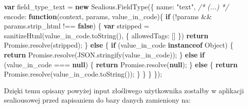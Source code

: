 \documentclass[12pt,polish,a4paper,]{report}
\newenvironment{Shaded}{}{}
\newcommand{\KeywordTok}[1]{\textcolor[rgb]{0.00,0.44,0.13}{\textbf{{#1}}}}
\newcommand{\DataTypeTok}[1]{\textcolor[rgb]{0.56,0.13,0.00}{{#1}}}
\newcommand{\StringTok}[1]{\textcolor[rgb]{0.25,0.44,0.63}{{#1}}}
\newcommand{\CommentTok}[1]{\textcolor[rgb]{0.38,0.63,0.69}{\textit{{#1}}}}
\newcommand{\VariableTok}[1]{\textcolor[rgb]{0.10,0.09,0.49}{{#1}}}
\newcommand{\ControlFlowTok}[1]{\textcolor[rgb]{0.00,0.44,0.13}{\textbf{{#1}}}}
\newcommand{\OperatorTok}[1]{\textcolor[rgb]{0.40,0.40,0.40}{{#1}}}
\newcommand{\AttributeTok}[1]{\textcolor[rgb]{0.49,0.56,0.16}{{#1}}}
\newcommand{\NormalTok}[1]{{#1}}
\begin{document}
\begin{Shaded}
\begin{Highlighting}[]
\KeywordTok{var} \NormalTok{field_type_text }\OperatorTok{=} \KeywordTok{new} \VariableTok{Sealious}\NormalTok{.}\AttributeTok{FieldType}\NormalTok{(}\OperatorTok{\{}
    \DataTypeTok{name}\OperatorTok{:} \StringTok{"text"}\OperatorTok{,}
    \CommentTok{/*}
\CommentTok{    (...)}
\CommentTok{    */}
    \DataTypeTok{encode}\OperatorTok{:} \KeywordTok{function}\NormalTok{(context}\OperatorTok{,} \NormalTok{params}\OperatorTok{,} \NormalTok{value_in_code)}\OperatorTok{\{}
        \ControlFlowTok{if} \NormalTok{(}\OperatorTok{!}\NormalTok{params }\OperatorTok{&&} \VariableTok{params}\NormalTok{.}\AttributeTok{strip_html} \OperatorTok{!==} \KeywordTok{false}\NormalTok{) }\OperatorTok{\{}
            \KeywordTok{var} \NormalTok{stripped }\OperatorTok{=} \AttributeTok{sanitizeHtml}\NormalTok{(}\VariableTok{value_in_code}\NormalTok{.}\AttributeTok{toString}\NormalTok{()}\OperatorTok{,} \OperatorTok{\{}
                \DataTypeTok{allowedTags}\OperatorTok{:} \NormalTok{[]}
            \OperatorTok{\}}\NormalTok{)}
            \ControlFlowTok{return} \VariableTok{Promise}\NormalTok{.}\AttributeTok{resolve}\NormalTok{(stripped)}\OperatorTok{;}
        \OperatorTok{\}} \ControlFlowTok{else} \OperatorTok{\{}
            \ControlFlowTok{if} \NormalTok{(value_in_code }\KeywordTok{instanceof} \NormalTok{Object) }\OperatorTok{\{}
                \ControlFlowTok{return} \VariableTok{Promise}\NormalTok{.}\AttributeTok{resolve}\NormalTok{(}\VariableTok{JSON}\NormalTok{.}\AttributeTok{stringify}\NormalTok{(value_in_code))}\OperatorTok{;}
            \OperatorTok{\}} \ControlFlowTok{else} \ControlFlowTok{if} \NormalTok{(value_in_code }\OperatorTok{===} \KeywordTok{null}\NormalTok{) }\OperatorTok{\{}
                \ControlFlowTok{return} \VariableTok{Promise}\NormalTok{.}\AttributeTok{resolve}\NormalTok{(}\KeywordTok{null}\NormalTok{)}\OperatorTok{;}
            \OperatorTok{\}} \ControlFlowTok{else} \OperatorTok{\{}
                \ControlFlowTok{return} \VariableTok{Promise}\NormalTok{.}\AttributeTok{resolve}\NormalTok{(}\VariableTok{value_in_code}\NormalTok{.}\AttributeTok{toString}\NormalTok{())}\OperatorTok{;}
            \OperatorTok{\}}
        \OperatorTok{\}}
    \OperatorTok{\}}
\OperatorTok{\}}\NormalTok{)}\OperatorTok{;}
\end{Highlighting}
\end{Shaded}

Dzięki temu opisany powyżej input złośliwego użytkownika zostałby w
aplikacji sealiousowej przed zapisaniem do bazy danych zamieniony na:
\end{document}
